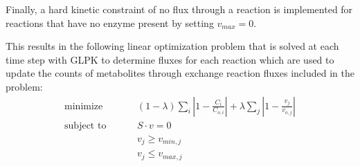 \documentclass[12pt]{article}
\begin{document}
Finally, a hard kinetic constraint of no flux through a reaction is implemented for reactions that have no enzyme present by setting $v_{max} = 0$.

This results in the following linear optimization problem that is solved at each time step with GLPK to determine fluxes for each reaction which are used to update the counts of metabolites through exchange reaction fluxes included in the problem: \\
\begin{align*}
\text{minimize} & \hspace{1cm} (1-\lambda)\sum\limits_i \left| 1-\frac{C_i}{C_{o,i}} \right| + \lambda \sum\limits_j \left| 1-\frac{v_j}{v_{o,j}} \right| \\
\text{subject to} & \hspace{1cm} S \cdot v = 0 \\
& \hspace{1cm} v_j \geq v_{min,j} \\
& \hspace{1cm} v_j \leq v_{max,j} \\
\end{align*}
\end{document}
